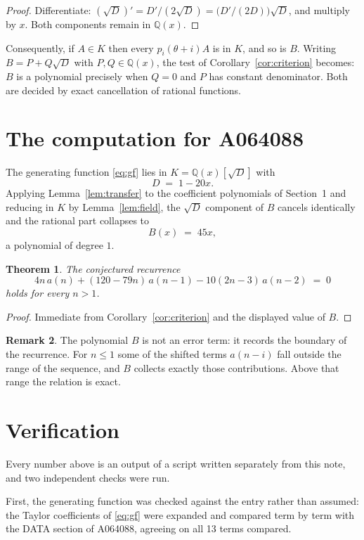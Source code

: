 \documentclass[11pt,a4paper]{article}
\theoremstyle{plain}
\newtheorem{theorem}{Theorem}
\theoremstyle{definition}
\newtheorem{remark}[theorem]{Remark}
\begin{document}
\begin{proof}
Differentiate: $(\sqrt{D})'=D'/(2\sqrt{D})=\bigl(D'/(2D)\bigr)\sqrt{D}$, and multiply by
$x$. Both components remain in $\mathbb{Q}(x)$.
\end{proof}

Consequently, if $A\in K$ then every $p_{i}(\theta+i)A$ is in $K$, and so is $B$. Writing
$B=P+Q\sqrt{D}$ with $P,Q\in\mathbb{Q}(x)$, the test of Corollary~\ref{cor:criterion}
becomes: $B$ is a polynomial precisely when $Q=0$ and $P$ has constant denominator. Both
are decided by exact cancellation of rational functions.

\section{The computation for A064088}

The generating function \eqref{eq:gf} lies in $K=\mathbb{Q}(x)[\sqrt{D}]$ with
\[
D \;=\; 1 - 20 x .
\]
Applying Lemma~\ref{lem:transfer} to the coefficient polynomials of Section~1 and reducing
in $K$ by Lemma~\ref{lem:field}, the $\sqrt{D}$ component of $B$ cancels identically and
the rational part collapses to
\[
B(x)\;=\;45 x ,
\]
a polynomial of degree $1$.

\begin{theorem}
The conjectured recurrence
\[
4 n\,a(n) + (120 - 79 n)\,a(n-1) -  10 \left(2 n - 3\right)\,a(n-2) \;=\;0
\]
holds for every $n>1$.
\end{theorem}

\begin{proof}
Immediate from Corollary~\ref{cor:criterion} and the displayed value of $B$.
\end{proof}

\begin{remark}
The polynomial $B$ is not an error term: it records the boundary of the recurrence. For
$n\le1$ some of the shifted terms $a(n-i)$ fall outside the range of the sequence,
and $B$ collects exactly those contributions. Above that range the relation is exact.
\end{remark}

\section{Verification}

Every number above is an output of a script written separately from this note, and two
independent checks were run.

First, the generating function was checked against the entry rather than assumed: the
Taylor coefficients of \eqref{eq:gf} were expanded and compared term by term with the DATA
section of A064088, agreeing on all 13 terms compared.
\end{document}
